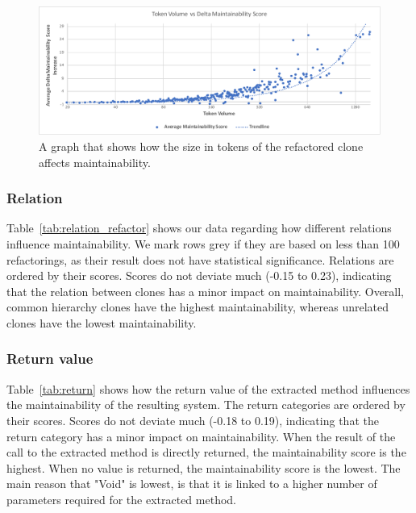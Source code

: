 \documentclass[sigconf,review,anonymous]{acmart}
\begin{document}
\begin{figure}
  \includegraphics[width=1\textwidth]{img/tokenvolume}
  \caption{A graph that shows how the size in tokens of the refactored clone affects maintainability.}
  \label{fig:maintainabilityscore}
\end{figure}

\subsubsection{Relation}
Table~\ref{tab:relation_refactor} shows our data regarding how different relations influence maintainability. We mark rows grey if they are based on less than 100 refactorings, as their result does not have statistical significance. Relations are ordered by their scores. %
Scores do not deviate much (-0.15 to 0.23), indicating that the relation between clones has a minor impact on maintainability. Overall, common hierarchy clones have the highest maintainability, whereas unrelated clones have the lowest maintainability.

\subsubsection{Return value}
Table~\ref{tab:return} shows how the return value of the extracted method influences the maintainability of the resulting system. The return categories are ordered by their scores. %
Scores do not deviate much (-0.18 to 0.19), indicating that the return category has a minor impact on maintainability. When the result of the call to the extracted method is directly returned, the maintainability score is the highest. When no value is returned, the maintainability score is the lowest. %
The main reason that "Void" is lowest, is that it is linked to a higher number of parameters required for the extracted method.
\end{document}
